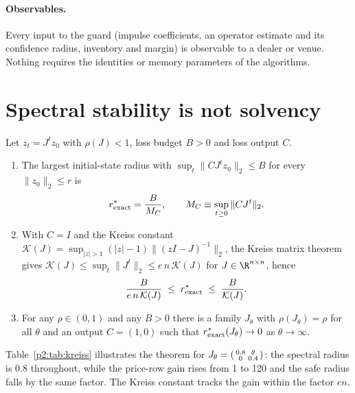 \paragraph{Observables.} Every input to the guard (impulse coefficients, an operator estimate and its confidence radius, inventory and margin) is observable to a dealer or venue. Nothing requires the identities or memory parameters of the algorithms.

\section{Spectral stability is not solvency}\label{p2:sec:radius}

\begin{theorem}\label{p2:thm:radius}
Let $z_t=J^tz_0$ with $\rho(J)<1$, loss budget $B>0$ and loss output $C$.
\begin{enumerate}[label=(\roman*)]
\item The largest initial-state radius with $\sup_t\|CJ^tz_0\|_2\le B$ for every $\|z_0\|_2\le r$ is
\begin{equation}\label{p2:eq:rexact}
r^*_{\rm exact}=\frac{B}{M_C},\qquad M_C\equiv\sup_{t\ge0}\|CJ^t\|_2 .
\end{equation}
\item With $C=I$ and the Kreiss constant $\mathcal K(J)=\sup_{|z|>1}(|z|-1)\|(zI-J)^{-1}\|_2$, the Kreiss matrix theorem gives $\mathcal K(J)\le\sup_t\|J^t\|_2\le e\,n\,\mathcal K(J)$ for $J\in\R^{n\times n}$, hence
\begin{equation}\label{p2:eq:kreiss}
\frac{B}{e\,n\,\mathcal K(J)}\;\le\;r^*_{\rm exact}\;\le\;\frac{B}{\mathcal K(J)} .
\end{equation}
\item For any $\rho\in(0,1)$ and any $B>0$ there is a family $J_\theta$ with $\rho(J_\theta)=\rho$ for all $\theta$ and an output $C=(1,0)$ such that $r^*_{\rm exact}(J_\theta)\to0$ as $\theta\to\infty$.
\end{enumerate}
\end{theorem}

Table~\ref{p2:tab:kreiss} illustrates the theorem for $J_\theta=\begin{psmallmatrix}0.8&\theta\\0&0.4\end{psmallmatrix}$: the spectral radius is $0.8$ throughout, while the price-row gain rises from 1 to 120 and the safe radius falls by the same factor. The Kreiss constant tracks the gain within the factor $en$.

